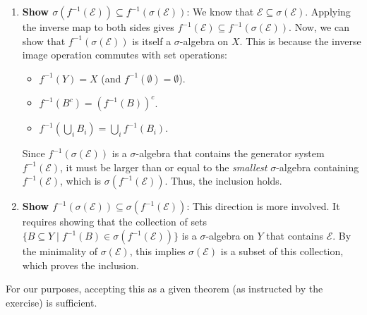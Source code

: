 \documentclass[11pt,a4paper]{article}
\begin{document}
\begin{enumerate}
    \item \textbf{Show $\sigma(f^{-1}(\mathcal{E})) \subseteq f^{-1}(\sigma(\mathcal{E}))$}:
    We know that $\mathcal{E} \subseteq \sigma(\mathcal{E})$. Applying the inverse map to both sides gives $f^{-1}(\mathcal{E}) \subseteq f^{-1}(\sigma(\mathcal{E}))$.
    Now, we can show that $f^{-1}(\sigma(\mathcal{E}))$ is itself a $\sigma$-algebra on $X$. This is because the inverse image operation commutes with set operations:
    \begin{itemize}
        \item $f^{-1}(Y) = X$ (and $f^{-1}(\emptyset) = \emptyset$).
        \item $f^{-1}(B^c) = (f^{-1}(B))^c$.
        \item $f^{-1}(\bigcup_i B_i) = \bigcup_i f^{-1}(B_i)$.
    \end{itemize}
    Since $f^{-1}(\sigma(\mathcal{E}))$ is a $\sigma$-algebra that contains the generator system $f^{-1}(\mathcal{E})$, it must be larger than or equal to the \emph{smallest} $\sigma$-algebra containing $f^{-1}(\mathcal{E})$, which is $\sigma(f^{-1}(\mathcal{E}))$. Thus, the inclusion holds.

    \item \textbf{Show $f^{-1}(\sigma(\mathcal{E})) \subseteq \sigma(f^{-1}(\mathcal{E}))$}:
    This direction is more involved. It requires showing that the collection of sets $\{B \subseteq Y \mid f^{-1}(B) \in \sigma(f^{-1}(\mathcal{E}))\}$ is a $\sigma$-algebra on $Y$ that contains $\mathcal{E}$. By the minimality of $\sigma(\mathcal{E})$, this implies $\sigma(\mathcal{E})$ is a subset of this collection, which proves the inclusion.
\end{enumerate}
For our purposes, accepting this as a given theorem (as instructed by the exercise) is sufficient.
\end{document}
